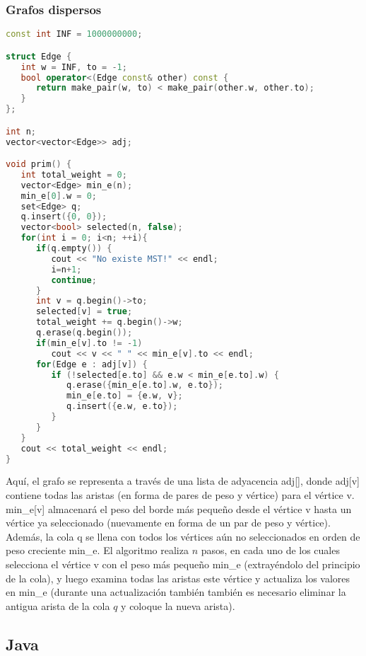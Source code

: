 \subsubsection{Grafos dispersos}
\begin{lstlisting}[language=C++]
const int INF = 1000000000;

struct Edge {
   int w = INF, to = -1;
   bool operator<(Edge const& other) const {
      return make_pair(w, to) < make_pair(other.w, other.to);
   }
};

int n;
vector<vector<Edge>> adj;

void prim() {
   int total_weight = 0;
   vector<Edge> min_e(n);
   min_e[0].w = 0;
   set<Edge> q;
   q.insert({0, 0});
   vector<bool> selected(n, false);
   for(int i = 0; i<n; ++i){
      if(q.empty()) {
         cout << "No existe MST!" << endl;
         i=n+1;
         continue;
      }
      int v = q.begin()->to;
      selected[v] = true;
      total_weight += q.begin()->w;
      q.erase(q.begin());
      if(min_e[v].to != -1)
         cout << v << " " << min_e[v].to << endl;
      for(Edge e : adj[v]) {
         if (!selected[e.to] && e.w < min_e[e.to].w) {
            q.erase({min_e[e.to].w, e.to});
            min_e[e.to] = {e.w, v};
            q.insert({e.w, e.to});
         }
      }
   }
   cout << total_weight << endl;
}
\end{lstlisting}

Aquí, el grafo se representa a través de una lista de adyacencia adj[], donde adj[v] contiene todas las aristas (en forma de pares de peso y vértice) para el vértice v. min\_e[v] almacenará el peso del borde más pequeño desde el vértice v hasta un vértice ya seleccionado (nuevamente en forma de un par de peso y vértice). Además, la cola q se llena con todos los vértices aún no seleccionados en orden de peso creciente min\_e. El algoritmo realiza $n$ pasos, en cada uno de los cuales selecciona el vértice v con el peso más pequeño min\_e (extrayéndolo del principio de la cola), y luego examina todas las aristas este vértice y actualiza los valores en min\_e (durante una actualización también también es necesario eliminar la antigua arista de la cola $q$ y coloque la nueva arista).

\subsection{Java}

